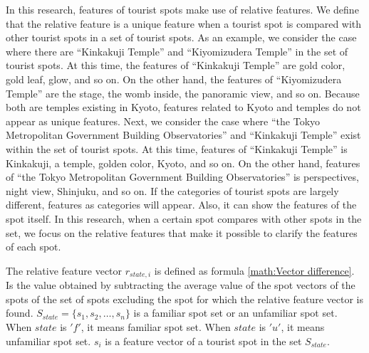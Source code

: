 \documentclass[journal]{IAENGtran}
\begin{document}
In this research, features of tourist spots make use of relative features.
We define that the relative feature is a unique feature when a tourist spot is compared with other tourist spots in a set of tourist spots.
As an example, we consider the case where there are ``Kinkakuji Temple'' and ``Kiyomizudera Temple'' in the set of tourist spots.
At this time, the features of ``Kinkakuji Temple'' are gold color, gold leaf, glow, and so on.
On the other hand, the features of ``Kiyomizudera Temple'' are the stage, the womb inside, the panoramic view, and so on.
Because both are temples existing in Kyoto, features related to Kyoto and temples do not appear as unique features.
Next, we consider the case where ``the Tokyo Metropolitan Government Building Observatories'' and ``Kinkakuji Temple'' exist within the set of tourist spots.
At this time, features of ``Kinkakuji Temple'' is Kinkakuji, a temple, golden color, Kyoto, and so on.
On the other hand, features of ``the Tokyo Metropolitan Government Building Observatories'' is perspectives, night view, Shinjuku, and so on.
If the categories of tourist spots are largely different, features as categories will appear.
Also, it can show the features of the spot itself.
In this research, when a certain spot compares with other spots in the set, we focus on the relative features that make it possible to clarify the features of each spot.

The relative feature vector $r_{state,i}$ is defined as formula \ref{math:Vector difference}.
Is the value obtained by subtracting the average value of the spot vectors of the spots of the set of spots excluding the spot for which the relative feature vector is found.
$S_{state} =\{s_1,s_2,\dots,s_n\}$ is a familiar spot set or an unfamiliar spot set.
When $state$ is $'f'$, it means familiar spot set.
When $state$ is $'u'$, it means unfamiliar spot set.
$s_i$ is a feature vector of a tourist spot in the set $S_{state}$.
\end{document}
